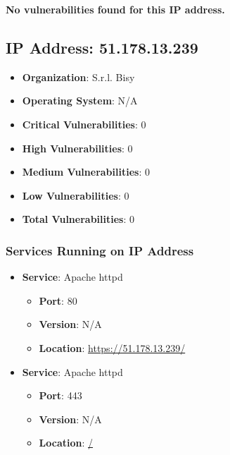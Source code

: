 \documentclass{article}
\begin{document}
\textbf{No vulnerabilities found for this IP address.}




\clearpage



\subsection{IP Address: 51.178.13.239}

\begin{itemize}
    \item \textbf{Organization}: S.r.l. Bisy
    \item \textbf{Operating System}:  N/A 
    \item \textbf{Critical Vulnerabilities}: 0
    \item \textbf{High Vulnerabilities}: 0
    \item \textbf{Medium Vulnerabilities}: 0
    \item \textbf{Low Vulnerabilities}: 0
    \item \textbf{Total Vulnerabilities}: 0
\end{itemize}

\subsubsection*{Services Running on IP Address}

\begin{itemize}
    
        \item \textbf{Service}: Apache httpd
        \begin{itemize}
            \item \textbf{Port}: 80
            \item \textbf{Version}:  N/A 
            \item \textbf{Location}: \href{ https://51.178.13.239/ }{ https://51.178.13.239/ }
        \end{itemize}
    
        \item \textbf{Service}: Apache httpd
        \begin{itemize}
            \item \textbf{Port}: 443
            \item \textbf{Version}:  N/A 
            \item \textbf{Location}: \href{ / }{ / }
        \end{itemize}
    
\end{itemize}
\end{document}
